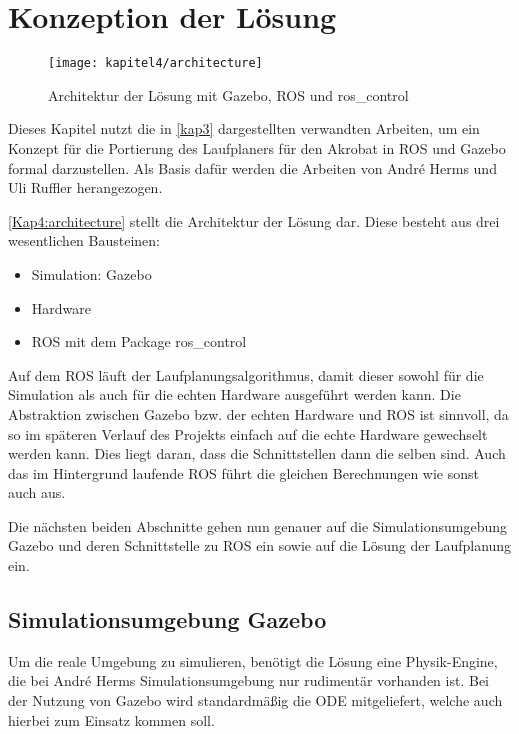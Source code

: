 \chapter{Konzeption der Lösung}
\label{kap4}

\begin{figure}[b!]
  \centering
  \texttt{[image: kapitel4/architecture]}
  \caption[Architektur der Lösung mit Gazebo, \ac{ROS} und ros\_control]{Architektur der Lösung mit Gazebo, \ac{ROS} und ros\_control \autocite{chitta2017ros_control}}
  \label{Kap4:architecture}
\end{figure}

Dieses Kapitel nutzt die in \autoref{kap3} dargestellten verwandten Arbeiten, um ein Konzept für die Portierung des Laufplaners für den Akrobat in \ac{ROS} und Gazebo formal darzustellen. Als Basis dafür werden die Arbeiten von André Herms \autocite{herms2004} und Uli Ruffler \autocite{ruffler2006} herangezogen.

\autoref{Kap4:architecture} stellt die Architektur der Lösung dar. Diese besteht aus drei wesentlichen Bausteinen:
\begin{itemize}
\item Simulation: Gazebo
\item Hardware
\item \ac{ROS} mit dem Package ros\_control
\end{itemize}

Auf dem \ac{ROS} läuft der Laufplanungsalgorithmus, damit dieser sowohl für die Simulation als auch für die echten Hardware ausgeführt werden kann. Die Abstraktion zwischen Gazebo bzw. der echten Hardware und \ac{ROS} ist sinnvoll, da so im späteren Verlauf des Projekts einfach auf die echte Hardware gewechselt werden kann. Dies liegt daran, dass die Schnittstellen dann die selben sind. Auch das im Hintergrund laufende \ac{ROS} führt die gleichen Berechnungen wie sonst auch aus.

Die nächsten beiden Abschnitte gehen nun genauer auf die Simulationsumgebung Gazebo und deren Schnittstelle zu \ac{ROS} ein sowie auf die Lösung der Laufplanung ein.

\section{Simulationsumgebung Gazebo} 

Um die reale Umgebung zu simulieren, benötigt die Lösung eine Physik-Engine, die bei André Herms \autocite{herms2004} Simulationsumgebung nur rudimentär vorhanden ist. Bei der Nutzung von Gazebo wird standardmäßig die \acf{ODE} mitgeliefert, welche auch hierbei zum Einsatz kommen soll.

